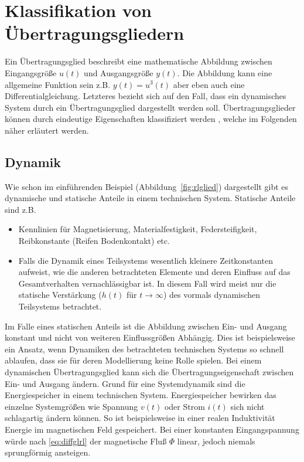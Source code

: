 \section{Klassifikation von Übertragungsgliedern}
%
Ein Übertragungsglied beschreibt eine mathematische Abbildung zwischen Eingangsgröße $u(t)$ und Ausgangsgröße $y(t)$. Die Abbildung kann eine allgemeine Funktion sein z.B. $y(t)=u^{3}(t)$ aber eben auch eine Differentialgleichung. Letzteres bezieht sich auf den Fall, dass ein dynamisches System durch ein Übertragungsglied dargestellt werden soll. Übertragungsglieder können durch eindeutige Eigenschaften klassifiziert werden \cite{Foellinger94, Unbehauen08, Lunze10, Zacher17}, welche im Folgenden näher erläutert werden.
%
\subsection{Dynamik}
%
Wie schon im einführenden Beispiel (Abbildung~\ref{fig:rlglied}) dargestellt gibt es dynamische und statische Anteile in einem technischen System. Statische Anteile sind z.B.
%
\begin{itemize}
	\item Kennlinien für Magnetisierung, Materialfestigkeit, Federsteifigkeit, Reibkonstante (Reifen Bodenkontakt) etc.
	\item Falls die Dynamik eines Teilsystems wesentlich kleinere Zeitkonstanten aufweist, wie die anderen betrachteten Elemente und deren Einfluss auf das Gesamtverhalten vernachlässigbar ist. In diesem Fall wird meist nur die statische Verstärkung ($h(t)$ für $t\rightarrow \infty$) des vormals dynamischen Teilsystems betrachtet.
\end{itemize}
%
Im Falle eines statischen Anteils ist die Abbildung zwischen Ein- und Ausgang konstant und nicht von weiteren Einflussgrößen Abhängig. Dies ist beispielsweise ein Ansatz, wenn Dynamiken des betrachteten technischen Systems so schnell ablaufen, dass sie für deren Modellierung keine Rolle spielen. Bei einem dynamischen Übertragungsglied kann sich die Übertragungseigenschaft zwischen Ein- und Ausgang ändern. Grund für eine Systemdynamik sind die Energiespeicher in einem technischen System. Energiespeicher bewirken das einzelne Systemgrößen wie Spannung $v(t)$ oder Strom $i(t)$ sich nicht schlagartig ändern können. So ist beispielsweise in einer realen Induktivität Energie im magnetischen Feld gespeichert. Bei einer konstanten Eingangspannung würde nach \eqref{eq:diffglrl} der magnetische Fluß $\Phi$ linear, jedoch niemals sprungförmig ansteigen.
%

